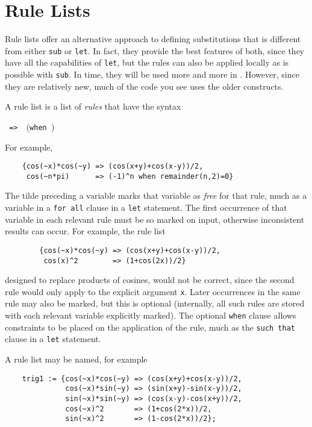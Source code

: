 \section{Rule Lists} 

Rule lists offer an alternative approach to defining substitutions that is
different from either \texttt{sub} or \texttt{let}.  In fact, they provide the
best features of both, since they have all the capabilities of \texttt{let},
but the rules can also be applied locally as is possible with \texttt{sub}.
In time, they will be used more and more in {\REDUCE}.  However, since they
are relatively new, much of the {\REDUCE} code you see uses the older
constructs.

\hypertarget{reserved:WHEN}{}
A rule list is a list of \emph{rules} that have the syntax
\begin{syntax}
     \texttt{ => }\ (\texttt{when })
\end{syntax}
For example,
\begin{verbatim}
    {cos(~x)*cos(~y) => (cos(x+y)+cos(x-y))/2,
     cos(~n*pi)      => (-1)^n when remainder(n,2)=0}
\end{verbatim}

The tilde preceding a variable marks that variable as \emph{free} for that
rule, much as a variable in a \texttt{for all} clause in a \texttt{let}
statement.  The first occurrence of that variable in each relevant rule
must be so marked on input, otherwise inconsistent results can occur.
For example, the rule list
\begin{verbatim}
        {cos(~x)*cos(~y) => (cos(x+y)+cos(x-y))/2,
         cos(x)^2        => (1+cos(2x))/2}
\end{verbatim}
designed to replace products of cosines, would not be correct, since the
second rule would only apply to the explicit argument \texttt{x}.  Later
occurrences in the same rule may also be marked, but this is optional
(internally, all such rules are stored with each relevant variable
explicitly marked).  The optional \texttt{when} clause allows
constraints to be placed on the application of the rule, much as the 
\texttt{such that} clause in a \texttt{let} statement.

A rule list may be named, for example
\begin{verbatim}
    trig1 := {cos(~x)*cos(~y) => (cos(x+y)+cos(x-y))/2,
              cos(~x)*sin(~y) => (sin(x+y)-sin(x-y))/2,
              sin(~x)*sin(~y) => (cos(x-y)-cos(x+y))/2,
              cos(~x)^2       => (1+cos(2*x))/2,
              sin(~x)^2       => (1-cos(2*x))/2};
\end{verbatim}

